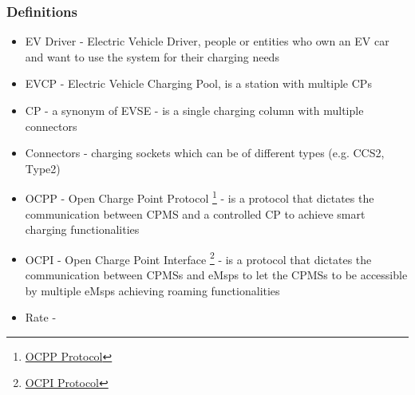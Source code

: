 \subsubsection{Definitions}
\begin{itemize}
    \item EV Driver - Electric Vehicle Driver, people or entities who own an EV car and want to use the system for their charging needs
    \item EVCP - Electric Vehicle Charging Pool, is a station with multiple CPs
    \item CP - a synonym of EVSE - is a single charging column with multiple connectors
    \item Connectors - charging sockets which can be of different types (e.g. CCS2, Type2)
    \item OCPP - Open Charge Point Protocol \footnote{\href{https://www.openchargealliance.org/protocols/ocpp-201/}{OCPP Protocol}} - is a protocol that dictates the communication between CPMS and a controlled CP to achieve smart charging functionalities
    \item OCPI - Open Charge Point Interface \footnote{\href{https://evroaming.org/ocpi-background/}{OCPI Protocol}} - is a protocol that dictates the communication between CPMSs and eMsps to let the CPMSs to be accessible by multiple eMsps achieving roaming functionalities
    \item Rate - 
\end{itemize}

